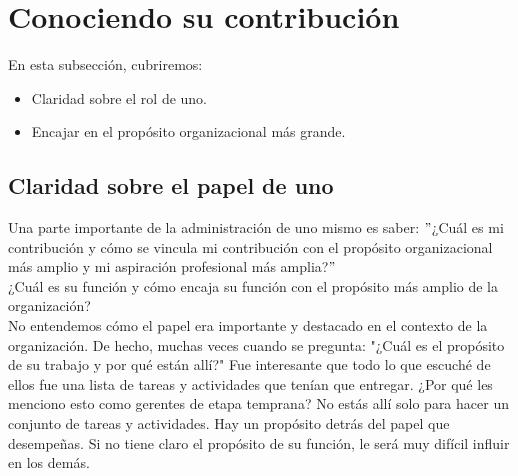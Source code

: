 \documentclass[10pt]{book}
\begin{document}
\section{Conociendo su contribución}
En esta subsección, cubriremos:
\begin{itemize}
\item Claridad sobre el rol de uno.
\item Encajar en el propósito organizacional más grande.
\end{itemize}
\subsection{Claridad sobre el papel de uno}
Una parte importante de la administración de uno mismo es saber: $"$¿Cuál es mi contribución y cómo se vincula mi contribución con el propósito organizacional más amplio y mi aspiración profesional más amplia?$"$\\
¿Cuál es su función y cómo encaja su función con el propósito más amplio de la organización?\\
No entendemos cómo el papel era importante y destacado en el contexto de la organización. De hecho, muchas veces cuando se pregunta: "¿Cuál es el propósito de su trabajo y por qué están allí?" Fue interesante que todo lo que escuché de ellos fue una lista de tareas y actividades que tenían que entregar. ¿Por qué les menciono esto como gerentes de etapa temprana? No estás allí solo para hacer un conjunto de tareas y actividades. Hay un propósito detrás del papel que desempeñas. Si no tiene claro el propósito de su función, le será muy difícil influir en los demás.
\end{document}
